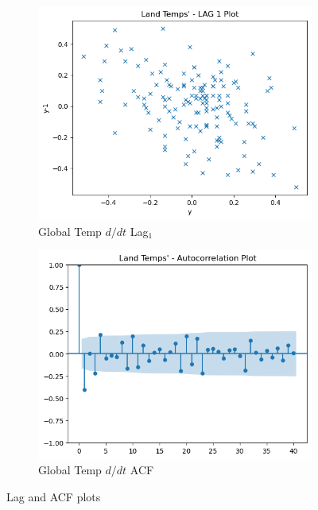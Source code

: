 \documentclass{article}
\begin{document}
\begin{figure}[htbp]
  \centering
  \begin{subfigure}[b]{0.45\textwidth}
    \includegraphics[width=\textwidth]{img/global_temp_dt/lag_1.png}
    \caption{Global Temp $d/dt$ Lag$_1$}
    \label{fig:global_temp_dtlag}
  \end{subfigure}
  \hfill
  \begin{subfigure}[b]{0.45\textwidth}
    \includegraphics[width=\textwidth]{img/global_temp_dt/acf.png}
    \caption{Global Temp $d/dt$ ACF}
    \label{fig:global_temp_dtacf}
  \end{subfigure}
  \caption{Lag and ACF plots}
  \label{fig:global_temp_dt3}
\end{figure}
\end{document}
